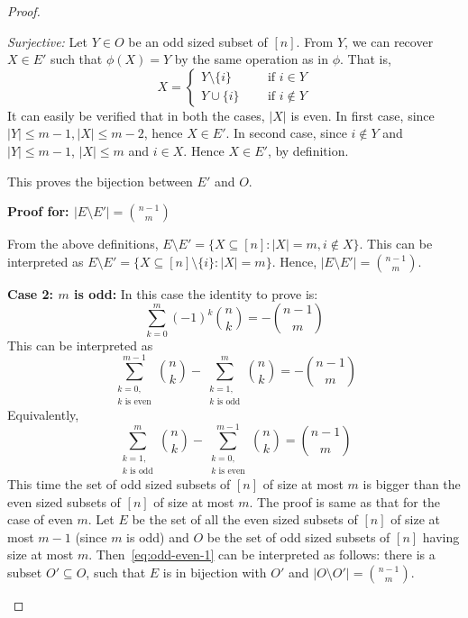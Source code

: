 \begin{proof}
\begin{description}
\begin{description}
\item \textit{Surjective:} Let $Y\in O$ be an odd sized subset of $[n]$. From $Y$, we can recover $X\in E'$ such that $\phi(X) = Y$ by the same operation as in $\phi$. That is, 
 \[
 X= 
 \begin{cases}
Y\setminus \{i\} & ~~~~~\text{ if } i\in Y\\
Y\cup\{i\} & ~~~~~\text{ if } i\not\in Y
 \end{cases}
 \]
 It can easily be verified that in both the cases, $|X|$ is even. 
 In first case, since $|Y|\le m-1, |X|\le m-2$, hence $X\in E'$. In second case, since $i\not\in Y$ and $|Y|\le m-1$, $|X|\le m$ and $i\in X$. Hence $X\in E'$, by definition.
\end{description}
This proves the bijection between $E'$ and $O$. 

\textbf{Proof for: $|E\setminus E'| = {n-1\choose m}$}

From the above definitions, $E\setminus E' = \{X\subseteq [n]: |X| = m, i\not\in X\}$. This can be interpreted as $E\setminus E' = \{X\subseteq [n]\setminus \{i\}: |X| = m\}$. Hence, $|E\setminus E'| = {n-1\choose m}$.

\item \textbf{\textbf{Case 2:} $m$ is odd:} In this case the identity to prove is:
\begin{equation}
\label{eq:even-odd-3}
    \sum_{k=0}^m (-1)^k{n\choose k} = - {n-1\choose m}
\end{equation}
This can be interpreted as 
\begin{equation}
\label{eq:even-odd-2}
    \sum_{\substack{k=0,\\k\text{ is even}}}^{m-1} {n\choose k} -  \sum_{\substack{k=1,\\k\text{ is odd}}}^{m} {n\choose k} = -{n-1\choose m}
\end{equation}
Equivalently,
\begin{equation}
\label{eq:odd-even-1}
    \sum_{\substack{k=1,\\k\text{ is odd}}}^{m} {n\choose k} - \sum_{\substack{k=0,\\k\text{ is even}}}^{m-1} {n\choose k}  = {n-1\choose m}
\end{equation}
This time the set of odd sized subsets of $[n]$ of size at most $m$ is bigger than the even sized subsets of $[n]$ of size at most $m$.
The proof is same as that for the case of even $m$. 
Let $E$ be the set of all the even sized subsets of $[n]$ of size at most $m-1$ (since $m$ is odd) and $O$ be the set of odd sized subsets of $[n]$ having size at most $m$. Then~\eqref{eq:odd-even-1} can be interpreted as follows: there is a subset $O'\subseteq O$, such that $E$ is in bijection with $O'$ and $|O\setminus O'| = {n-1\choose m}$.
  

\end{description}
\end{proof}
